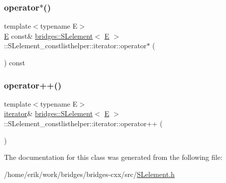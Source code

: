 \mbox{\label{classbridges_1_1_s_lelement_1_1_s_lelement__constlisthelper_1_1iterator_a0aaebb950a365119cdd038974d3e6bd7}} 
\subsubsection{\texorpdfstring{operator$\ast$()}{operator*()}}
{\footnotesize\ttfamily template$<$typename E$>$ \\
\hyperlink{namespacebridges_acfb0a4f7877d8f63de3e6862004c50eda3a3ea00cfc35332cedf6e5e9a32e94da}{E} const\& \hyperlink{classbridges_1_1_s_lelement}{bridges\+::\+S\+Lelement}$<$ \hyperlink{namespacebridges_acfb0a4f7877d8f63de3e6862004c50eda3a3ea00cfc35332cedf6e5e9a32e94da}{E} $>$\+::S\+Lelement\+\_\+constlisthelper\+::iterator\+::operator$\ast$ (\begin{DoxyParamCaption}{ }\end{DoxyParamCaption}) const\hspace{0.3cm}{\ttfamily [inline]}}

\mbox{\label{classbridges_1_1_s_lelement_1_1_s_lelement__constlisthelper_1_1iterator_a1de6ed4b50ede98a435fd92ebc318cfb}} 
\subsubsection{\texorpdfstring{operator++()}{operator++()}}
{\footnotesize\ttfamily template$<$typename E$>$ \\
\hyperlink{classbridges_1_1_s_lelement_1_1_s_lelement__constlisthelper_1_1iterator}{iterator}\& \hyperlink{classbridges_1_1_s_lelement}{bridges\+::\+S\+Lelement}$<$ \hyperlink{namespacebridges_acfb0a4f7877d8f63de3e6862004c50eda3a3ea00cfc35332cedf6e5e9a32e94da}{E} $>$\+::S\+Lelement\+\_\+constlisthelper\+::iterator\+::operator++ (\begin{DoxyParamCaption}{ }\end{DoxyParamCaption})\hspace{0.3cm}{\ttfamily [inline]}}



The documentation for this class was generated from the following file\+:\begin{DoxyCompactItemize}
\item 
/home/erik/work/bridges/bridges-\/cxx/src/\hyperlink{_s_lelement_8h}{S\+Lelement.\+h}\end{DoxyCompactItemize}

